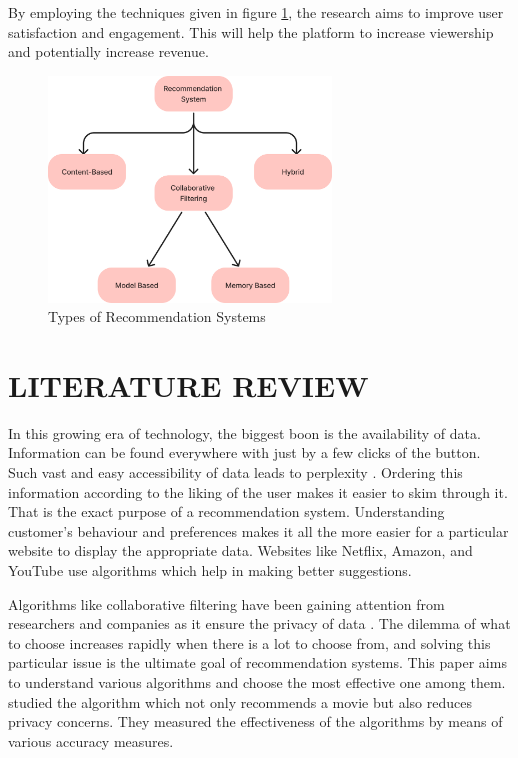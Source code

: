 \documentclass[a4paper,10pt]{article}
\begin{document}
By employing the techniques given in figure \ref{Intro}, the research aims to improve user satisfaction and engagement. This will help the platform to increase viewership and potentially increase revenue.

\begin{figure}[H]
\centering
\includegraphics[height=6cm]{figures/Intro.png}
\caption{Types of Recommendation Systems}
\label{Intro}
\end{figure}



\section{LITERATURE REVIEW}

In this growing era of technology, the biggest boon is the availability of data. Information can be found everywhere with just by a few clicks of the button. Such vast and easy accessibility of data leads to perplexity \cite{Yeole2021}. Ordering this information according to the liking of the user makes it easier to skim through it. That is the exact purpose of a recommendation system. Understanding customer's behaviour and preferences makes it all the more easier for a particular website to display the appropriate data. Websites like Netflix, Amazon, and YouTube use algorithms which help in making better suggestions. 
\vspace{4pt}

Algorithms like collaborative filtering have been gaining attention from researchers and companies as it ensure the privacy of data \cite{chenna2020}. The dilemma of what to choose increases rapidly when there is a lot to choose from, and solving this particular issue is the ultimate goal of recommendation systems. This paper aims to understand various algorithms and choose the most effective one among them. \cite{chenna2020} studied the algorithm which not only recommends a movie but also reduces privacy concerns. They measured the effectiveness of the algorithms by means of various accuracy measures. 
\end{document}
